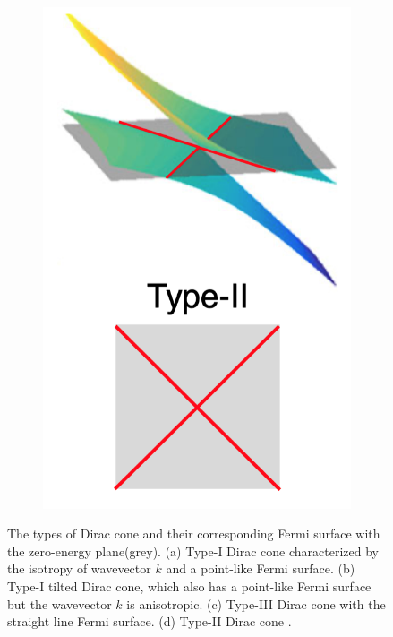 \begin{figure}[H]
\begin{subfigure}[b]{0.2\linewidth}
            \includegraphics[width = \linewidth]{fig/Chap 2/Type II.png}
            \caption{}
            \label{2fig:type2}
        \end{subfigure}
    \caption{The types of Dirac cone and their corresponding Fermi surface with the zero-energy plane(grey). 
                (a) Type-I Dirac cone characterized by the isotropy of wavevector $k$ and a point-like Fermi surface.
                (b) Type-I tilted Dirac cone, which also has a point-like Fermi surface but the wavevector $k$ is anisotropic.
                (c) Type-III Dirac cone with the straight line Fermi surface.
                (d) Type-II Dirac cone \cite{Milicevic2019}.}
    \label{2fig:Dirac cone type}
    \end{figure}
